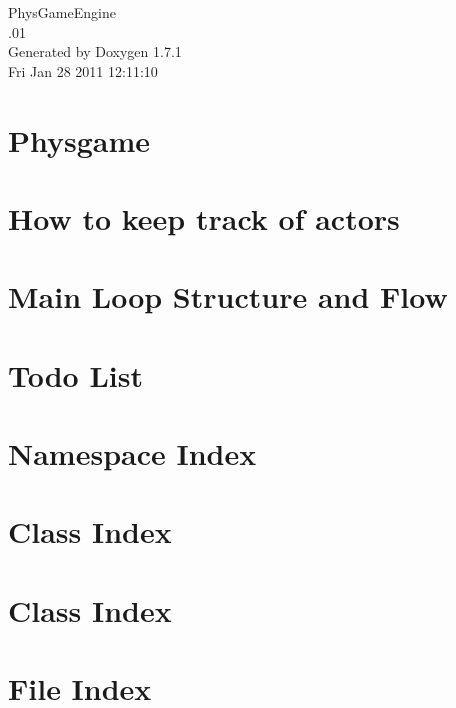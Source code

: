 \documentclass[a4paper]{book}
\begin{document}
\hypersetup{pageanchor=false}
\begin{titlepage}
\vspace*{7cm}
\begin{center}
{\Large PhysGameEngine \\[1ex]\large .01 }\\
\vspace*{1cm}
{\large Generated by Doxygen 1.7.1}\\
\vspace*{0.5cm}
{\small Fri Jan 28 2011 12:11:10}\\
\end{center}
\end{titlepage}
\clearemptydoublepage
{}
\tableofcontents
\clearemptydoublepage
{}
\hypersetup{pageanchor=true}
\chapter{Physgame}
\label{index}\hypertarget{index}{}
\chapter{How to keep track of actors}
\label{actorcontainer1}
\hypertarget{actorcontainer1}{}

\chapter{Main Loop Structure and Flow}
\label{mainloop1}
\hypertarget{mainloop1}{}

\chapter{Todo List}
\label{todo}
\hypertarget{todo}{}

\chapter{Namespace Index}

\chapter{Class Index}

\chapter{Class Index}

\chapter{File Index}

\end{document}
